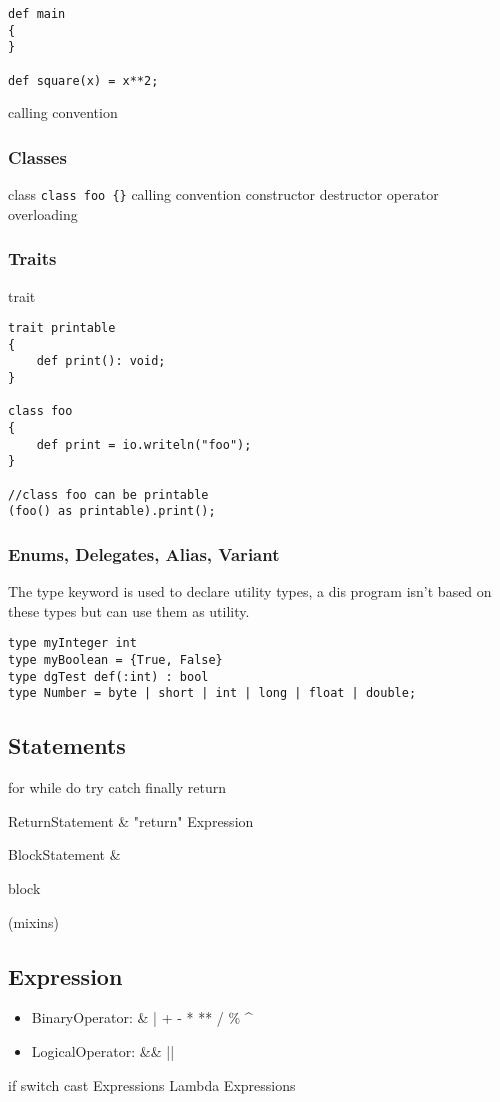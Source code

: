 \begin{lstlisting}
def main
{
}

def square(x) = x**2;
\end{lstlisting}

calling convention

\subsubsection{Classes}
class
\lstinline!class foo {}!
calling convention
constructor
destructor
operator overloading

\subsubsection{Traits}
trait
\begin{lstlisting}
trait printable
{
	def print(): void;
}

class foo
{
	def print = io.writeln("foo");
}

//class foo can be printable
(foo() as printable).print();
\end{lstlisting}

\subsubsection{Enums, Delegates, Alias, Variant}
The type keyword is used to declare utility types, a dis program isn't based on these types but can use them as utility.

\begin{lstlisting}
type myInteger int
type myBoolean = {True, False}
type dgTest def(:int) : bool
type Number = byte | short | int | long | float | double;
\end{lstlisting}


\subsection{Statements}
for 
while do  
try catch finally
return

\begin{ebnf}
ReturnStatement & \rightarrow "return" Expression \\
\end{ebnf}

\begin{ebnf}
BlockStatement &  \\
\end{ebnf}

block

(mixins)

\subsection{Expression}
\begin{itemize}
\item BinaryOperator: \& | + - * ** / \% \textasciicircum{} 
\item LogicalOperator: \&\&  ||
\end{itemize}
if 
switch
cast Expressions
Lambda Expressions

